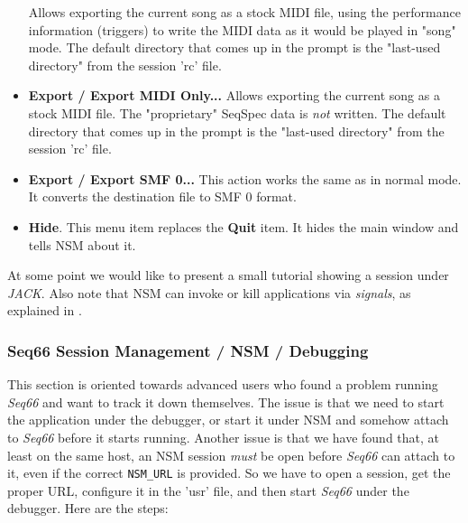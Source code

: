 \begin{itemize}
         Allows exporting the current song as a stock MIDI file, using the
         performance information (triggers) to write the MIDI data as it would
         be played in "song" mode.
         The default directory that comes up in the
         prompt is the "last-used directory" from the session 'rc' file.
      \item \textbf{Export / Export MIDI Only...}
         Allows exporting the current song as a stock MIDI file.
         The "proprietary" SeqSpec data is \textsl{not} written.
         The default directory that comes up in the
         prompt is the "last-used directory" from the session 'rc' file.
      \item \textbf{Export / Export SMF 0...}
         This action works the same as in normal mode.
         It converts the destination file to SMF 0 format.
      \item \textbf{Hide}.
         This menu item replaces the \textbf{Quit} item.
         It hides the main window and tells NSM about it.
   \end{itemize}

   At some point we would like to present a small tutorial showing a session
   under \textsl{JACK}.
   Also note that NSM can invoke or kill applications via
   \textsl{signals}, as explained in 
   .

\subsubsection{Seq66 Session Management / NSM / Debugging}
\label{subsubsec:sessions_debugging}

   This section is oriented towards advanced users who found a problem running
   \textsl{Seq66} and want to track it down themselves.  The issue is that we
   need to start the application under the debugger, or start it under NSM and
   somehow attach to \textsl{Seq66} before it starts running.  Another issue is
   that we have found that, at least on the same host, an NSM session
   \textsl{must} be open before \textsl{Seq66} can attach to it, even if the
   correct \texttt{NSM\_URL} is provided.
   So we have to open a session, get the proper URL, configure it in the 'usr'
   file, and then start \textsl{Seq66} under the debugger.
   Here are the steps:

